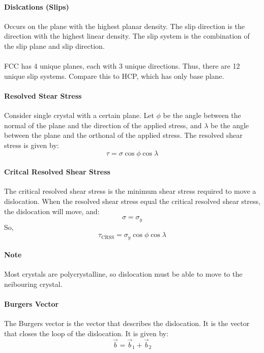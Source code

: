 \documentclass[11pt]{article}
\begin{document}
\paragraph{Dislcations (Slips)} Occurs on the plane with the highest planar density. The slip direction is the direction with the highest linear density. The slip system is the combination of the slip plane and slip direction.
\paragraph{} FCC has 4 unique planes, each with 3 unique directions. Thus, there are 12 unique slip systems. Compare this to HCP, which has only base plane.
\paragraph{Resolved Stear Stress} Consider single crystal with a certain plane. Let $\phi$ be the angle between the normal of the plane and the direction of the applied stress, and $\lambda$ be the angle between the plane and the orthonal of the applied stress. The resolved shear stress is given by:
\begin{equation}
    \tau = \sigma \cos \phi \cos \lambda
\end{equation}
\paragraph{Critcal Resolved Shear Stress} The critical resolved shear stress is the minimum shear stress required to move a dislocation. When the resolved shear stress equal the critical resolved shear stress, the dislocation will move, and:
\begin{equation}
    \sigma = \sigma_{y}
\end{equation}
So,
\begin{equation}
   \tau_{\text{CRSS}} = \sigma_{y} \cos \phi \cos \lambda
\end{equation}
\paragraph{Note} Most crystals are polycrystalline, so dislocation must be able to move to the neibouring crystal.
\paragraph{Burgers Vector} The Burgers vector is the vector that describes the dislocation. It is the vector that closes the loop of the dislocation. It is given by:
\begin{equation}
    \vec{b} = \vec{b}_1 + \vec{b}_2
\end{equation}
\end{document}
